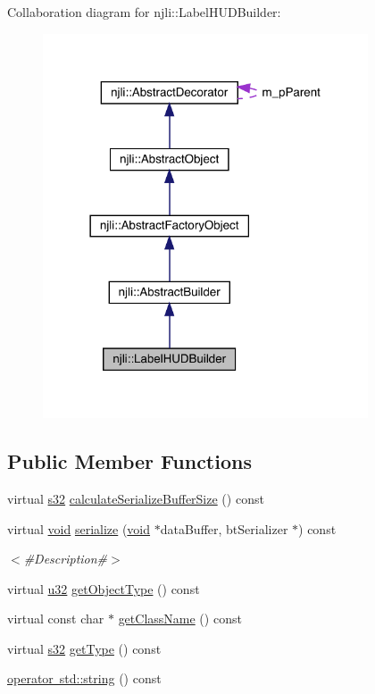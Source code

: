 Collaboration diagram for njli\+:\+:Label\+H\+U\+D\+Builder\+:\nopagebreak
\begin{figure}[H]
\begin{center}
\leavevmode
\includegraphics[width=273pt]{classnjli_1_1_label_h_u_d_builder__coll__graph}
\end{center}
\end{figure}
\subsection*{Public Member Functions}
\begin{DoxyCompactItemize}
\item 
virtual \mbox{\hyperlink{_util_8h_aa62c75d314a0d1f37f79c4b73b2292e2}{s32}} \mbox{\hyperlink{classnjli_1_1_label_h_u_d_builder_a4474a67e7fed5f17ebd37a3a0019da06}{calculate\+Serialize\+Buffer\+Size}} () const
\item 
virtual \mbox{\hyperlink{_thread_8h_af1e856da2e658414cb2456cb6f7ebc66}{void}} \mbox{\hyperlink{classnjli_1_1_label_h_u_d_builder_aec96df7406190d4c0d6c9d6cb4f71de4}{serialize}} (\mbox{\hyperlink{_thread_8h_af1e856da2e658414cb2456cb6f7ebc66}{void}} $\ast$data\+Buffer, bt\+Serializer $\ast$) const
\begin{DoxyCompactList}\small\item\em $<$\#\+Description\#$>$ \end{DoxyCompactList}\item 
virtual \mbox{\hyperlink{_util_8h_a10e94b422ef0c20dcdec20d31a1f5049}{u32}} \mbox{\hyperlink{classnjli_1_1_label_h_u_d_builder_a7b2ce22588b0935205f2f116446affd2}{get\+Object\+Type}} () const
\item 
virtual const char $\ast$ \mbox{\hyperlink{classnjli_1_1_label_h_u_d_builder_a065dab35d2ad65345003a168a6748cb4}{get\+Class\+Name}} () const
\item 
virtual \mbox{\hyperlink{_util_8h_aa62c75d314a0d1f37f79c4b73b2292e2}{s32}} \mbox{\hyperlink{classnjli_1_1_label_h_u_d_builder_aa7e57d529bee575b73ddd4f70d39fd32}{get\+Type}} () const
\item 
\mbox{\hyperlink{classnjli_1_1_label_h_u_d_builder_a77c96ea5dcd8921522ac5d6e9c025908}{operator std\+::string}} () const
\end{DoxyCompactItemize}
